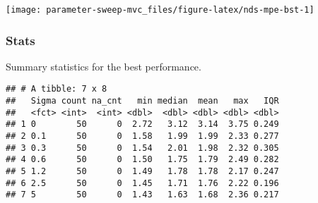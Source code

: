 \documentclass[]{book}
\newenvironment{Shaded}{\begin{snugshade}}{\end{snugshade}}
\newcommand{\DataTypeTok}[1]{\textcolor[rgb]{0.13,0.29,0.53}{#1}}
\newcommand{\KeywordTok}[1]{\textcolor[rgb]{0.13,0.29,0.53}{\textbf{#1}}}
\newcommand{\NormalTok}[1]{#1}
\newcommand{\OperatorTok}[1]{\textcolor[rgb]{0.81,0.36,0.00}{\textbf{#1}}}
\newcommand{\OtherTok}[1]{\textcolor[rgb]{0.56,0.35,0.01}{#1}}
\newcommand{\StringTok}[1]{\textcolor[rgb]{0.31,0.60,0.02}{#1}}
\begin{document}
\texttt{[image: parameter-sweep-mvc\_files/figure-latex/nds-mpe-bst-1]}

\hypertarget{stats-48}{%
\subsubsection{Stats}\label{stats-48}}

Summary statistics for the best performance.

\begin{Shaded}
\end{Shaded}

\begin{verbatim}
## # A tibble: 7 x 8
##   Sigma count na_cnt   min median  mean   max   IQR
##   <fct> <int>  <int> <dbl>  <dbl> <dbl> <dbl> <dbl>
## 1 0        50      0  2.72   3.12  3.14  3.75 0.249
## 2 0.1      50      0  1.58   1.99  1.99  2.33 0.277
## 3 0.3      50      0  1.54   2.01  1.98  2.32 0.305
## 4 0.6      50      0  1.50   1.75  1.79  2.49 0.282
## 5 1.2      50      0  1.49   1.78  1.78  2.17 0.247
## 6 2.5      50      0  1.45   1.71  1.76  2.22 0.196
## 7 5        50      0  1.43   1.63  1.68  2.36 0.217
\end{verbatim}
\end{document}
